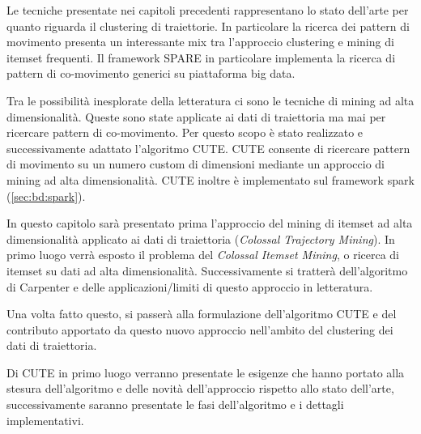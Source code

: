 Le tecniche presentate nei capitoli precedenti rappresentano lo stato dell'arte per quanto riguarda il clustering di traiettorie.
In particolare la ricerca dei pattern di movimento presenta un interessante mix tra l'approccio clustering e mining di itemset frequenti.
Il framework SPARE in particolare implementa la ricerca di pattern di co-movimento generici su piattaforma big data.

Tra le possibilità inesplorate della letteratura ci sono le tecniche di mining ad alta dimensionalità.
Queste sono state applicate ai dati di traiettoria ma mai per ricercare pattern di co-movimento.
Per questo scopo è stato realizzato e successivamente adattato l'algoritmo CUTE.
CUTE consente di ricercare pattern di movimento su un numero custom di dimensioni mediante un approccio di mining ad alta dimensionalità.
CUTE inoltre è implementato sul framework spark (\cref{sec:bd:spark}).

In questo capitolo sarà presentato prima l'approccio del mining di itemset ad alta dimensionalità applicato ai dati di traiettoria (\textit{Colossal Trajectory Mining}).
In primo luogo verrà esposto il problema del \textit{Colossal Itemset Mining}, o ricerca di itemset su dati ad alta dimensionalità.
Successivamente si tratterà dell'algoritmo di Carpenter e delle applicazioni/limiti di questo approccio in letteratura.

Una volta fatto questo, si passerà alla formulazione dell'algoritmo CUTE e
del contributo apportato da questo nuovo approccio nell'ambito del clustering dei dati di traiettoria.

Di CUTE in primo luogo verranno presentate le esigenze che hanno portato alla stesura dell'algoritmo e delle novità dell'approccio rispetto allo stato dell'arte,
successivamente saranno presentate le fasi dell'algoritmo e i dettagli implementativi.
